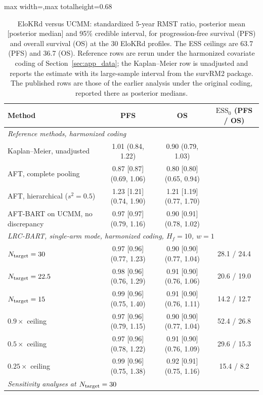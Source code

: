 \documentclass[11pt]{article}
\theoremstyle{definition}
\theoremstyle{plain}
\begin{document}
\begin{table}[htbp]
\centering
\singlespacing
\caption{EloKRd versus UCMM: standardized 5-year RMST ratio, posterior mean [posterior median] and 95\% credible interval, for progression-free survival (PFS) and overall survival (OS) at the 30 EloKRd profiles. The ESS ceilings are 63.7 (PFS) and 36.7 (OS). Reference rows are rerun under the harmonized covariate coding of Section~\ref{sec:app_data}; the Kaplan--Meier row is unadjusted and reports the estimate with its large-sample interval from the survRM2 package. The published rows are those of the earlier analysis under the original coding, reported there as posterior medians.}
\label{tab:app}
\small
\setlength{\tabcolsep}{5pt}
\renewcommand{\arraystretch}{1}
\begin{adjustbox}{max width=\textwidth,max totalheight=0.68\textheight}
\begin{tabular}{lccc}
\toprule
Method & PFS & OS & $\mathrm{ESS}_0$ (PFS / OS) \\
\midrule
\multicolumn{4}{l}{\textit{Reference methods, harmonized coding}} \\
Kaplan--Meier, unadjusted & 1.01 (0.84, 1.22) & 0.90 (0.79, 1.03) &  \\
AFT, complete pooling & 0.87 [0.87] (0.69, 1.06) & 0.80 [0.80] (0.65, 0.94) &  \\
AFT, hierarchical ($s^2=0.5$) & 1.23 [1.21] (0.74, 1.90) & 1.21 [1.19] (0.77, 1.70) &  \\
AFT-BART on UCMM, no discrepancy & 0.97 [0.97] (0.79, 1.16) & 0.90 [0.91] (0.78, 1.02) &  \\
\midrule
\multicolumn{4}{l}{\textit{LRC-BART, single-arm mode, harmonized coding, $H_f=10$, $w=1$}} \\
$N_{\rm target}=30$ & 0.97 [0.96] (0.77, 1.23) & 0.90 [0.90] (0.77, 1.04) & 28.1 / 24.4 \\
$N_{\rm target}=22.5$ & 0.98 [0.96] (0.76, 1.29) & 0.91 [0.90] (0.76, 1.06) & 20.6 / 19.0 \\
$N_{\rm target}=15$ & 0.99 [0.96] (0.75, 1.40) & 0.91 [0.90] (0.76, 1.11) & 14.2 / 12.7 \\
$0.9\times$ ceiling & 0.97 [0.96] (0.79, 1.15) & 0.90 [0.90] (0.77, 1.04) & 52.4 / 26.8 \\
$0.5\times$ ceiling & 0.97 [0.96] (0.78, 1.22) & 0.91 [0.90] (0.76, 1.09) & 29.6 / 15.3 \\
$0.25\times$ ceiling & 0.99 [0.96] (0.75, 1.38) & 0.92 [0.91] (0.75, 1.16) & 15.4 / 8.2 \\
\midrule
\multicolumn{4}{l}{\textit{Sensitivity analyses at $N_{\rm target}=30$}} \\

\end{tabular}
\end{adjustbox}
\end{table}
\end{document}
